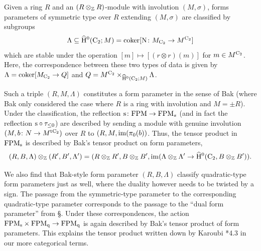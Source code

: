 \begin{remark}
Given a ring $R$ and an $(R\otimes_{\mathbb{Z}} R)$-module with involution $(M,\sigma)$, 
forms parameters of symmetric type over $R$ extending $(M,\sigma)$ 
are classified by subgroups 
\[
\Lambda \subseteq \widehat{\mathrm{H}}^0(\mathrm{C_2};M) = \mathrm{coker}[\mathrm{N}\colon M_{\mathrm{C_2}} \to M^{\mathrm{C_2}}]
\]
which are stable under the operation $[m] \mapsto [(r\otimes r)(m)]$ for $m \in M^{\mathrm{C_2}}$. Here, the correspondence between these two types of data is given by $\Lambda =  \mathrm{coker}[M_{\mathrm{C_2}}\to Q]$ and $Q = M^{\mathrm{C_2}} \times_{\widehat{\mathrm{H}}^0(\mathrm{C_2};M)} \Lambda$.
 
 Such a triple $(R, M, \Lambda)$ %
 constitutes a form parameter in the sense of Bak (where Bak only considered the case where $R$ is a ring with involution and $M=\pm R$). Under the classification, the reflection $\mathrm{s}\colon \mathrm {FPM} \to \mathrm {FPM}_s$ (and in fact the reflection $\mathrm{s}\circ \tau_{\leq 0}$) are described by sending a module with genuine involution $(M,b\colon N\to M^{\mathrm{t}\mathrm{C_2}})$ over $R$ to $(R, M, \mathrm{im}(\pi_0(b))$. Thus, the tensor product in $\mathrm {FPM}_{\mathrm{s}}$ is described by Bak's tensor product on form parameters,
\[
(R, B, \Lambda)\otimes_{\mathbb{Z}} (R', B', \Lambda') = (R\otimes_{\mathbb{Z}} R', B\otimes_{\mathbb{Z}} B', \mathrm{im}(\Lambda\otimes_{\mathbb{Z}} \Lambda'\to \widehat{\mathrm{H}}^0(\mathrm{C_2}, B\otimes_{\mathbb{Z}} B')).
\]

We also find that Bak-style form parameter $(R, B, \Lambda)$ classify quadratic-type form parameters just as well, where the duality however needs to be twisted by a sign. The passage from the symmetric-type parameter to the corresponding quadratic-type parameter corresponds to the passage to the ``dual form parameter'' from \S{}. Under these correspondences, the action $\mathrm {FPM}_{\mathrm{s}}\times \mathrm {FPM}_{\mathrm{q}}\to \mathrm {FPM}_{\mathrm{q}}$ is again described by Bak's tensor product of form parameters. This explains the tensor product written down by Karoubi \cite{karoubi-periodicity}*{4.3} in our more categorical terms. 
\end{remark}
